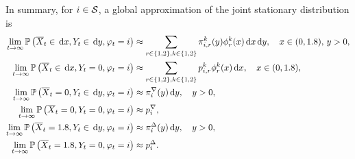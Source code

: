 In summary, for \(i\in\mathcal{S}\), a global approximation of the joint stationary distribution is
\begin{align*}
	\lim\limits_{t\to\infty}\mathbb{P}\left(\overline X_t \in \, \mathrm{d} x, Y_t \in \, \mathrm{d} y, \varphi_{t} = i\right) &\approx \displaystyle \sum_{r\in\{1,2\},k\in\{1,2\}}  {\pi}_{i,r}^k(y)\phi_r^k(x)\, \mathrm{d} x \, \mathrm{d} y ,\quad x\in(0,1.8),\, y>0, \\
	\lim\limits_{t\to\infty}\mathbb{P}\left(\overline X_t \in \, \mathrm{d} x, Y_t=0, \varphi_{t} = i\right) & \approx \displaystyle \sum_{r\in\{1,2\},k\in\{1,2\}}  {p}_{i,r}^k\phi_r^k(x)\, \mathrm{d} x ,\quad x\in(0,1.8),\\
	 \lim\limits_{t\to\infty}\mathbb{P}\left(\overline X_t =0, Y_t \in \, \mathrm{d} y, \varphi_{t} = i\right) & \approx{\pi}_{i}^\nabla(y)\, \mathrm{d} y,\quad y>0, \\
	 \lim\limits_{t\to\infty}\mathbb{P}\left(\overline X_t = 0, Y_t =0, \varphi_{t} = i\right) & \approx {p}_{i}^\nabla,\quad \\ 
	 \lim\limits_{t\to\infty}\mathbb{P}\left(\overline X_t = 1.8, Y_t \in \, \mathrm{d} y, \varphi_{t} = i\right) & \approx {\pi}_{i}^\Delta(y)\, \mathrm{d} y,\quad y>0, \\
	 \lim\limits_{t\to\infty}\mathbb{P}\left(\overline X_t = 1.8, Y_t = 0, \varphi_{t} = i\right) & \approx {p}_{i}^\Delta.\quad
\end{align*}
